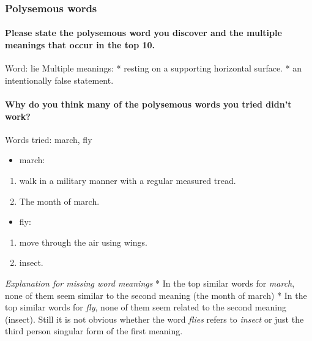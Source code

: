 \documentclass[11pt]{article}
\providecommand{\tightlist}{%
      \setlength{\itemsep}{0pt}\setlength{\parskip}{0pt}}
\begin{document}
\subsubsection{Polysemous words}\label{polysemous-words}

\paragraph{Please state the polysemous word you discover and the
multiple meanings that occur in the top
10.}\label{please-state-the-polysemous-word-you-discover-and-the-multiple-meanings-that-occur-in-the-top-10.}

Word: lie Multiple meanings: * resting on a supporting horizontal
surface. * an intentionally false statement.

\paragraph{Why do you think many of the polysemous words you tried
didn't
work?}\label{why-do-you-think-many-of-the-polysemous-words-you-tried-didnt-work}

Words tried: march, fly

\begin{itemize}
\tightlist
\item
  march:
\end{itemize}

\begin{enumerate}
\def\labelenumi{\arabic{enumi}.}
\tightlist
\item
  walk in a military manner with a regular measured tread.
\item
  The month of march.
\end{enumerate}

\begin{itemize}
\tightlist
\item
  fly:
\end{itemize}

\begin{enumerate}
\def\labelenumi{\arabic{enumi}.}
\tightlist
\item
  move through the air using wings.
\item
  insect.
\end{enumerate}

\emph{Explanation for missing word meanings} * In the top similar words
for \emph{march}, none of them seem similar to the second meaning (the
month of march) * In the top similar words for \emph{fly}, none of them
seem related to the second meaning (insect). Still it is not obvious
whether the word \emph{flies} refers to \emph{insect} or just the third
person singular form of the first meaning.
\end{document}
